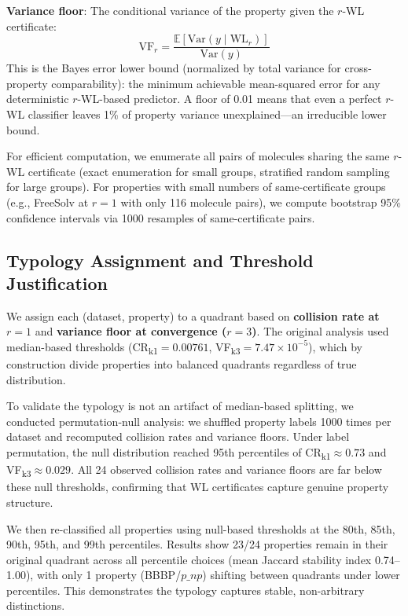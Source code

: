 \documentclass[11pt,letterpaper]{article}
\begin{document}
\textbf{Variance floor}: The conditional variance of the property given the $r$-WL certificate:
\begin{equation}
  \mathrm{VF}_r = \frac{\mathbb{E}[\mathrm{Var}(y \mid \mathrm{WL}_r)]}{\mathrm{Var}(y)}
\end{equation}
This is the Bayes error lower bound (normalized by total variance for cross-property comparability): the minimum achievable mean-squared error for any deterministic $r$-WL-based predictor. A floor of 0.01 means that even a perfect $r$-WL classifier leaves 1\% of property variance unexplained---an irreducible lower bound.

For efficient computation, we enumerate all pairs of molecules sharing the same $r$-WL certificate (exact enumeration for small groups, stratified random sampling for large groups). For properties with small numbers of same-certificate groups (e.g., FreeSolv at $r=1$ with only 116 molecule pairs), we compute bootstrap 95\% confidence intervals via 1000 resamples of same-certificate pairs.

\subsection{Typology Assignment and Threshold Justification}

We assign each (dataset, property) to a quadrant based on \textbf{collision rate at $r=1$} and \textbf{variance floor at convergence ($r=3$)}. The original analysis used median-based thresholds (CR\textsubscript{k1}$= 0.00761$, VF\textsubscript{k3}$= 7.47\times10^{-5}$), which by construction divide properties into balanced quadrants regardless of true distribution.

To validate the typology is not an artifact of median-based splitting, we conducted permutation-null analysis: we shuffled property labels 1000 times per dataset and recomputed collision rates and variance floors. Under label permutation, the null distribution reached 95th percentiles of CR\textsubscript{k1}$\approx 0.73$ and VF\textsubscript{k3}$\approx 0.029$. All 24 observed collision rates and variance floors are far below these null thresholds, confirming that WL certificates capture genuine property structure.

We then re-classified all properties using null-based thresholds at the 80th, 85th, 90th, 95th, and 99th percentiles. Results show 23/24 properties remain in their original quadrant across all percentile choices (mean Jaccard stability index 0.74--1.00), with only 1 property (BBBP/$p\_np$) shifting between quadrants under lower percentiles. This demonstrates the typology captures stable, non-arbitrary distinctions.
\end{document}
